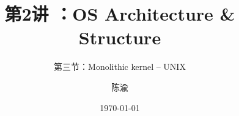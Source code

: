


\title[第1讲]{第2讲 ：OS Architecture \& Structure} %
\subtitle{第三节：Monolithic kernel -- UNIX }
\author{陈渝} %
\date{\today} %




\begin{frame}
\titlepage %
\end{frame}

